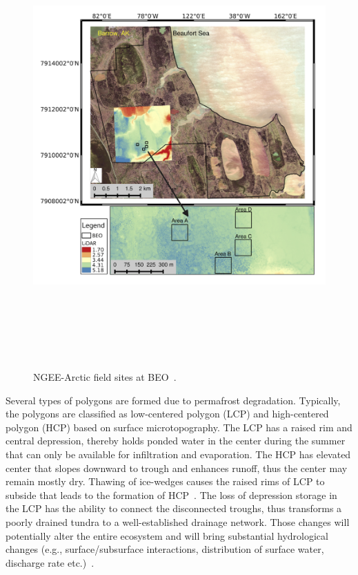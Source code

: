 \documentclass[review,11pt]{elsarticle}
\begin{document}
\begin{figure}[!h]
\centering
 \includegraphics[width=14cm, height=17cm]{./figures/ngee-arctic-fieldsites.png}
\caption{NGEE-Arctic field sites at BEO~\cite{kumar2016modeling}.}
\label{ngee-arctic-fieldsites}
\end{figure}
Several types of polygons are formed due to permafrost degradation. Typically, the polygons are classified as low-centered polygon (LCP) and high-centered polygon (HCP) based on surface microtopography. The LCP has a raised rim and central depression, thereby holds ponded water in the center during the summer that can only be available for infiltration and evaporation. The HCP has elevated center that slopes downward to trough and enhances runoff, thus the center may remain mostly dry. 
Thawing of ice-wedges causes the raised rims of LCP to subside that leads to the formation of HCP~\cite{jorgenson2006abrupt}. The loss of depression storage in the LCP has the ability to connect the disconnected troughs, thus transforms a poorly drained tundra to a well-established drainage network. Those changes will potentially alter the entire ecosystem and will bring substantial hydrological changes (e.g., surface/subsurface interactions, distribution of surface water, discharge rate etc.)~\cite{hinzman2005evidence,rowland2010arctic,liljedahl2012ice}.
\end{document}

